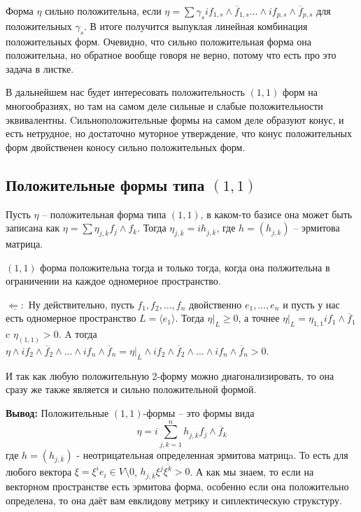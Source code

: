 Форма $\eta$ сильно положительна, если $\eta=\sum\gamma_sif_{1,s}\wedge \overline f_{1,s}\ldots
\wedge if_{p,s}\wedge\overline f_{p,s}$ для положительных $\gamma_s$. В итоге 
получится выпуклая линейная комбинация положительных форм. Очевидно, что сильно
положительная форма она положительна, но обратное вообще говоря не верно,
потому что есть про это задача в листке.

В дальнейшем нас будет интересовать положительность $(1,1)$ форм на многообразиях,
но там на самом деле сильные и слабые положительности эквивалентны.
Cильноположительные формы на самом деле образуют конус, и есть нетрудное, но
достаточно муторное утверждение, что конус положительных форм двойственен коносу
сильно положительных форм.

\subsection{Положительные формы типа $(1,1)$}
Пусть $\eta$ – положительная форма типа $(1,1)$, в каком-то базисе она может
быть записана как $\eta = \sum \eta_{j,\overline k} f_j\wedge f_k$. Тогда
$\eta_{j,\overline k}=ih_{j,\overline k}$, где $h=(h_{j,\overline k})$ – эрмитова
матрица.

\utv $(1,1)$ форма положительна тогда и только тогда, когда
она полжительна в ограничении на каждое одномерное пространство.

$\underline{\Leftarrow:}$ Ну действительно, пусть $f_1, f_2,\ldots,f_n$
двойственно $e_1,\ldots,e_n$ и пусть у нас есть одномерное пространство
$L=\langle e_1\rangle$. Тогда $\eta|_L\geq 0$, а точнее $\eta|_L=\eta_{1,1}if_1
\wedge \overline f_1$ c $\eta_(1,1)>0$. A тогда $\eta \wedge if_2\wedge\overline f_2\wedge\ldots
\wedge if_n\wedge\overline f_n=\eta|_L \wedge if_2\wedge\overline f_2\wedge\ldots
\wedge if_n\wedge\overline f_n>0$.

И так как любую положительную 2-форму можно диагонализировать, то она сразу же
также является и сильно положительной формой.

\textbf{Вывод:} Положительные $(1,1)$-формы – это формы вида 
\[\eta=i\sum_{j,k=1}^nh_{j,\overline k}f_j\wedge\overline f_k\]
где $h=(h_{j,\overline k})$ - неотрицательная определенная эрмитова матрицa. То
есть для любого вектора $\xi=\xi^i e_i\in V\setminus{0}$, $h_{j,\overline k}\xi^j\overline{\xi^k}
>0$. А как мы знаем, то если на векторном пространстве есть эрмитова форма,
особенно если она положительно определена, то она даёт вам евклидову метрику и
сиплектическую струкстуру.

